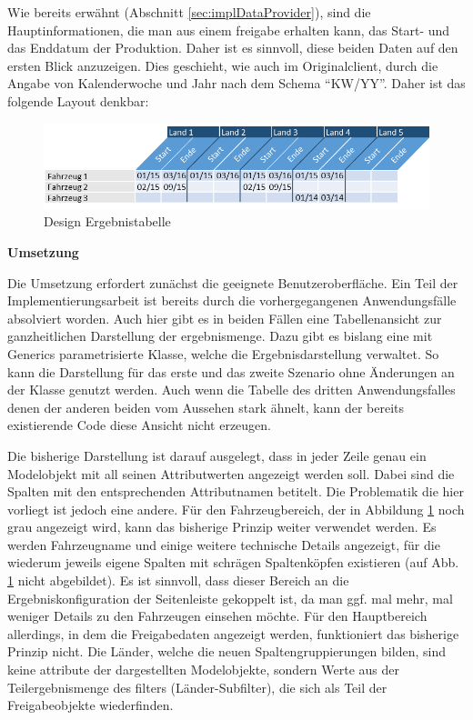 Wie bereits erwähnt (Abschnitt \ref{sec:implDataProvider}), sind die Hauptinformationen, die man aus einem \gls{freigabe} erhalten kann, das Start- und das Enddatum der Produktion. Daher ist es sinnvoll, diese beiden Daten auf den ersten Blick anzuzeigen. Dies geschieht, wie auch im Originalclient, durch die Angabe von Kalenderwoche und Jahr nach dem Schema \enquote{KW/YY}. Daher ist das folgende Layout denkbar:

\begin{figure}[H]
 \centering
 \includegraphics[width=1.0\textwidth]{grafiken/Tabelle_complete.png}
 \caption{Design Ergebnistabelle}
 \label{fig:tabelle3}
\end{figure}

\textbf{Umsetzung}

Die Umsetzung erfordert zunächst die geeignete Benutzeroberfläche. Ein Teil der Implementierungsarbeit ist bereits durch die vorhergegangenen Anwendungsfälle absolviert worden. Auch hier gibt es in beiden Fällen eine Tabellenansicht zur ganzheitlichen Darstellung der \gls{ergebnismenge}. Dazu gibt es bislang eine mit Generics parametrisierte Klasse, welche die Ergebnisdarstellung verwaltet. So kann die Darstellung für das erste und das zweite Szenario ohne Änderungen an der Klasse genutzt werden. Auch wenn die Tabelle des dritten Anwendungsfalles denen der anderen beiden vom Aussehen stark ähnelt, kann der bereits existierende Code diese Ansicht nicht erzeugen.

Die bisherige Darstellung ist darauf ausgelegt, dass in jeder Zeile genau ein Modelobjekt mit all seinen Attributwerten angezeigt werden soll. Dabei sind die Spalten mit den entsprechenden Attributnamen betitelt. Die Problematik die hier vorliegt ist jedoch eine andere. Für den Fahrzeugbereich, der in Abbildung \ref{fig:tabelle3} noch grau angezeigt wird, kann das bisherige Prinzip weiter verwendet werden. Es werden Fahrzeugname und einige weitere technische Details angezeigt, für die wiederum jeweils eigene Spalten mit schrägen Spaltenköpfen existieren (auf Abb. \ref{fig:tabelle3} nicht abgebildet). Es ist sinnvoll, dass dieser Bereich an die Ergebniskonfiguration der Seitenleiste gekoppelt ist, da man ggf. mal mehr, mal weniger Details zu den Fahrzeugen einsehen möchte. Für den Hauptbereich allerdings, in dem die Freigabedaten angezeigt werden, funktioniert das bisherige Prinzip nicht. Die Länder, welche die neuen Spaltengruppierungen bilden, sind keine \gls{attribut}e der dargestellten Modelobjekte, sondern Werte aus der Teilergebnismenge des \gls{filter}s (Länder-Subfilter), die sich als Teil der Freigabeobjekte wiederfinden.

